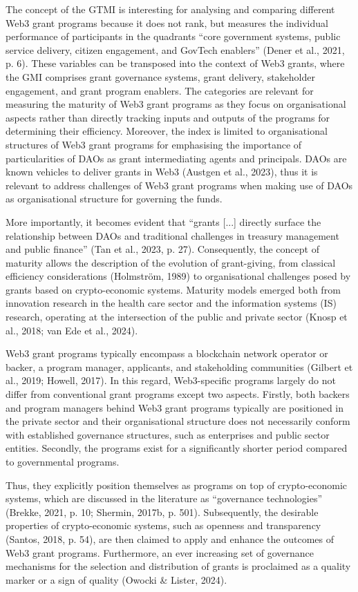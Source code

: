 \documentclass[conference]{IEEEtran}
\begin{document}
The concept of the GTMI is interesting for analysing and comparing different Web3 grant programs because it does not rank, but measures the individual performance of participants in the quadrants “core government systems, public service delivery, citizen engagement, and GovTech enablers” (Dener et al., 2021, p. 6). These variables can be transposed into the context of Web3 grants, where the GMI comprises grant governance systems, grant delivery, stakeholder engagement, and grant program enablers. The categories are relevant for measuring the maturity of Web3 grant programs as they focus on organisational aspects rather than directly tracking inputs and outputs of the programs for determining their efficiency. Moreover, the index is limited to organisational structures of Web3 grant programs for emphasising the importance of particularities of DAOs as grant intermediating agents and principals. DAOs are known vehicles to deliver grants in Web3 (Austgen et al., 2023), thus it is relevant to address challenges of Web3 grant programs when making use of DAOs as organisational structure for governing the funds. 


More importantly, it becomes evident that “grants [...] directly surface the relationship between DAOs and traditional challenges in treasury management and public finance” (Tan et al., 2023, p. 27). Consequently, the concept of maturity allows the description of the evolution of grant-giving, from classical efficiency considerations (Holmström, 1989) to organisational challenges posed by grants based on crypto-economic systems. Maturity models emerged both from innovation research in the health care sector and the information systems (IS) research, operating at the intersection of the public and private sector (Knosp et al., 2018; van Ede et al., 2024).

Web3 grant programs typically encompass a blockchain network operator or backer, a program manager, applicants, and stakeholding communities (Gilbert et al., 2019; Howell, 2017). In this regard, Web3-specific programs largely do not differ from conventional grant programs except two aspects. Firstly, both backers and program managers behind Web3 grant programs typically are positioned in the private sector and their organisational structure does not necessarily conform with established governance structures, such as enterprises and public sector entities. Secondly, the programs exist for a significantly shorter period compared to governmental programs.

Thus, they explicitly position themselves as programs on top of crypto-economic systems, which are discussed in the literature as “governance technologies” (Brekke, 2021, p. 10; Shermin, 2017b, p. 501). Subsequently, the desirable properties of crypto-economic systems, such as openness and transparency (Santos, 2018, p. 54), are then claimed to apply and enhance the outcomes of Web3 grant programs. Furthermore, an ever increasing set of governance mechanisms for the selection and distribution of grants is proclaimed as a quality marker or a sign of quality (Owocki \& Lister, 2024).
\end{document}
